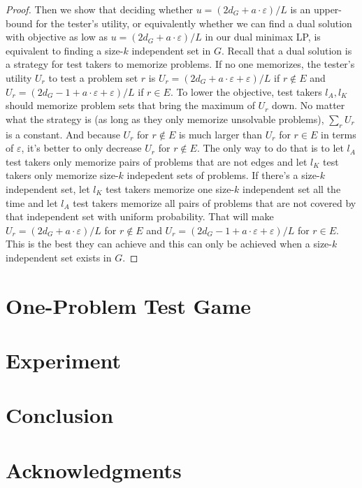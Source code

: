 \documentclass{article}
\begin{document}
\begin{proof}
Then we show that deciding whether $u = (2 d_G + a\cdot \varepsilon)/L$ is an
upper-bound for the tester's utility, or equivalently whether we can find a
dual solution with objective as low as $u = (2 d_G + a\cdot \varepsilon)/L$ in
our dual minimax LP, is equivalent to finding a size-$k$ independent set in
$G$. Recall that a dual solution is a strategy for test takers to memorize
problems. If no one memorizes, the tester's utility $U_r$ to test a problem set
$r$ is $U_r = (2d_G+a\cdot\varepsilon + \varepsilon) /L$ if $r \notin E$ and
$U_r = (2d_G-1+a\cdot\varepsilon + \varepsilon)/L$ if $r \in E$. To lower
the objective, test takers $l_A, l_K$ should memorize problem sets that bring the
maximum of $U_r$ down.  No matter what the strategy is (as long as they only
memorize unsolvable problems), $\sum_r U_r$ is a constant. And because $U_r$
for $r \notin E$ is much larger than $U_r$ for $r \in E$ in terms of
$\varepsilon$, it's better to only decrease $U_r$ for $r \notin E$. The only
way to do that is to let $l_A$ test takers only memorize pairs of problems
that are not edges and let $l_K$ test takers only memorize size-$k$ indepedent
sets of problems.  If there's a size-$k$ independent set, let $l_K$ test takers
memorize one size-$k$ independent set all the time and let $l_A$ test takers
memorize all pairs of problems that are not covered by that independent set with
uniform probability. That will make $U_r = (2d_G+a\cdot\varepsilon)/L$ for $r
\notin E$ and $U_r = (2d_G-1+a\cdot\varepsilon+\varepsilon)/L$ for $r \in E$.
This is the best they can achieve and this can only be achieved when a size-$k$
independent set exists in $G$.

\end{proof}

\section{One-Problem Test Game}

\section{Experiment}

\section{Conclusion}

\section*{Acknowledgments}
\end{document}
